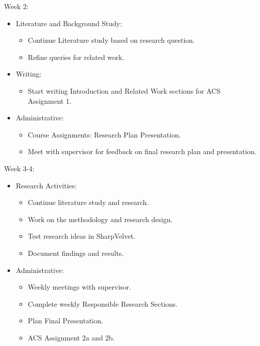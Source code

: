\documentclass[english, a4paper]{article}
\begin{document}
Week 2:
\begin{itemize}
    \item Literature and Background Study:
    \begin{itemize}
        \item Continue Literature study based on research question.
        \item Refine queries for related work.
    \end{itemize}

    \item Writing:
    \begin{itemize}
        \item Start writing Introduction and Related Work sections for ACS Assignment 1.
    \end{itemize}

    \item Administrative:
    \begin{itemize}
        \item Course Assignments: Research Plan Presentation.
        \item Meet with supervisor for feedback on final research plan and presentation.
    \end{itemize}
\end{itemize}

Week 3-4:
\begin{itemize}
    \item Research Activities:
    \begin{itemize}
        \item Continue literature study and research.
        \item Work on the methodology and research design.
        \item Test research ideas in SharpVelvet.
        \item Document findings and results.
    \end{itemize}
    
    \item Administrative:
    \begin{itemize}
        \item Weekly meetings with supervisor.
        \item Complete weekly Responsible Research Sections.
        \item Plan Final Presentation.
        \item ACS Assignment 2a and 2b.
    \end{itemize}
\end{itemize}
\end{document}
